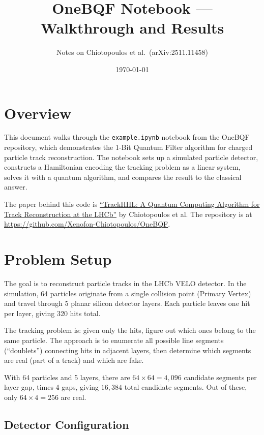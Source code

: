 \documentclass[11pt, a4paper]{article}
\title{OneBQF Notebook --- Walkthrough and Results}
\author{Notes on Chiotopoulos et al.\ (arXiv:2511.11458)}
\date{\today}
\begin{document}
\maketitle
\tableofcontents
\newpage

\section{Overview}

This document walks through the \texttt{example.ipynb} notebook from the
OneBQF repository, which demonstrates the 1-Bit Quantum Filter algorithm
for charged particle track reconstruction. The notebook sets up a
simulated particle detector, constructs a Hamiltonian encoding the
tracking problem as a linear system, solves it with a quantum algorithm,
and compares the result to the classical answer.

The paper behind this code is
\href{https://arxiv.org/abs/2511.11458}{``TrackHHL: A Quantum Computing
Algorithm for Track Reconstruction at the LHCb''} by Chiotopoulos et al.
The repository is at
\url{https://github.com/Xenofon-Chiotopoulos/OneBQF}.

\section{Problem Setup}

The goal is to reconstruct particle tracks in the LHCb VELO detector. In
the simulation, 64 particles originate from a single collision point
(Primary Vertex) and travel through 5 planar silicon detector layers. Each
particle leaves one hit per layer, giving 320 hits total.

The tracking problem is: given only the hits, figure out which ones belong
to the same particle. The approach is to enumerate all possible line
segments (``doublets'') connecting hits in adjacent layers, then determine
which segments are real (part of a track) and which are fake.

With 64 particles and 5 layers, there are $64 \times 64 = 4{,}096$
candidate segments per layer gap, times 4 gaps, giving $16{,}384$ total
candidate segments. Out of these, only $64 \times 4 = 256$ are real.

\subsection{Detector Configuration}
\end{document}
